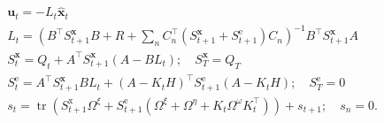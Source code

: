 $$
\begin{aligned}
&\mathbf{u}_{t}=-L_{t} \hat{\mathbf{x}}_{t} \\
&L_{t}=\left(B^\top S_{t+1}^{\mathbf{x}} B+R+\sum_{n} C_{n}^\top\left(S_{t+1}^{\mathbf{x}}+S_{t+1}^{\mathrm{e}}\right) C_{n}\right)^{-1} B^\top S_{t+1}^{\mathbf{x}} A \\
&S_{t}^{\mathbf{x}}=Q_{t}+A^\top S_{t+1}^{\mathbf{x}}\left(A-B L_{t}\right) ; \quad S_{T}^{\mathbf{x}}=Q_{T} \\
&S_{t}^{\mathrm{e}}=A^\top S_{t+1}^{\mathbf{x}} B L_t+\left(A-K_{t} H\right)^\top S_{t+1}^{\mathrm{e}}\left(A-K_{t} H\right) ; \quad S_{T}^{\mathrm{e}}=0\\
&s_{t}=\operatorname{tr}\left(S_{t+1}^{\mathrm{x}}\Omega^{\xi}+S_{t+1}^{\mathrm{e}}\left(\Omega^{\xi}+\Omega^{\eta}+K_{t} \Omega^{\omega} K_{t}^{\top}\right)\right)+s_{t+1} ; \quad s_{n}=0 .
\end{aligned}
$$